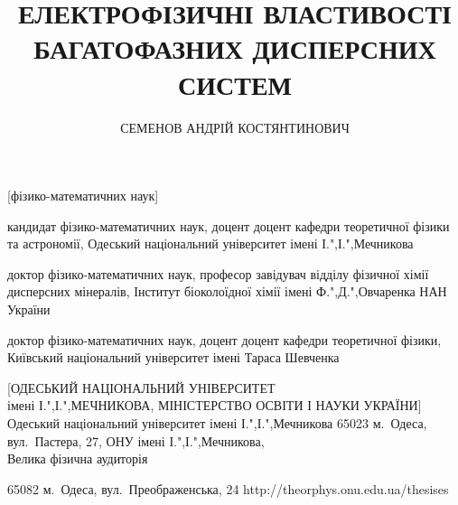 \documentclass[twoside,a4paper,14pt]{vakaref-utf8}
\begin{document}
\setlength{\abovedisplayskip}{4pt}%
\setlength{\abovedisplayshortskip}{4pt}%
\setlength{\belowdisplayskip}{4pt}%
\setlength{\belowdisplayshortskip}{4pt}%

\author{СЕМЕНОВ АНДРІЙ КОСТЯНТИНОВИЧ}



\title{ЕЛЕКТРОФІЗИЧНІ ВЛАСТИВОСТІ\\ БАГАТОФАЗНИХ
ДИСПЕРСНИХ СИСТЕМ}

[фізико-математичних наук]

  {кандидат фізико-математичних наук, доцент}
  {доцент кафедри теоретичної фізики та астрономії, 
  Одеський національний університет імені І.",І.",Мечникова}


  {доктор фізико-математичних наук, професор}
  {завідувач відділу фізичної хімії дисперсних мінералів, Інститут біоколоїдної хімії імені {Ф.",Д.",Овчаренка} НАН України}

  {доктор фізико-математичних наук, доцент}
  {доцент кафедри теоретичної фізики, Київський національний університет імені Тараса Шевченка}

  [ОДЕСЬКИЙ НАЦІОНАЛЬНИЙ УНІВЕРСИТЕТ\\ імені {І.",І.",МЕЧНИКОВА}, МІНІСТЕРСТВО ОСВІТИ І НАУКИ УКРАЇНИ]
  {Одеський національний університет імені {І.",І.",Мечникова}}
  {65023 м.~Одеса, вул.~Пастера, 27, ОНУ імені {І.",І.",Мечникова},\\ Велика фізична аудиторія}
  

{65082 м.~Одеса, вул.~Преображенська, 24}
{http://theorphys.onu.edu.ua/thesises}


\maketitle
\end{document}
